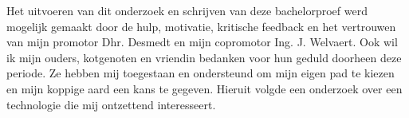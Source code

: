 \bigbreak{}

Het uitvoeren van dit onderzoek en schrijven van deze bachelorproef werd mogelijk gemaakt door de hulp, motivatie, kritische feedback en het vertrouwen van mijn promotor Dhr. Desmedt en mijn copromotor Ing. J. Welvaert. Ook wil ik mijn ouders, kotgenoten en vriendin bedanken voor hun geduld doorheen deze periode. Ze hebben mij toegestaan en ondersteund om mijn eigen pad te kiezen en mijn koppige aard een kans te gegeven. Hieruit volgde een onderzoek over een technologie die mij ontzettend interesseert.